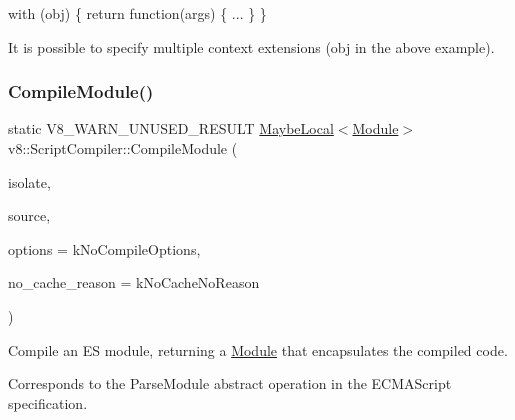 with (obj) \{ return function(args) \{ ... \} \}

It is possible to specify multiple context extensions (obj in the above example). \mbox{\label{classv8_1_1ScriptCompiler_a7a735ad28cd9925ef67c57a76422116c}} 
\subsubsection{\texorpdfstring{Compile\+Module()}{CompileModule()}}
{\footnotesize\ttfamily static V8\+\_\+\+W\+A\+R\+N\+\_\+\+U\+N\+U\+S\+E\+D\+\_\+\+R\+E\+S\+U\+LT \mbox{\hyperlink{classv8_1_1MaybeLocal}{Maybe\+Local}}$<$\mbox{\hyperlink{classv8_1_1Module}{Module}}$>$ v8\+::\+Script\+Compiler\+::\+Compile\+Module (\begin{DoxyParamCaption}\item[{Isolate $\ast$}]{isolate,  }\item[{\mbox{\hyperlink{classv8_1_1ScriptCompiler_1_1Source}{Source}} $\ast$}]{source,  }\item[{Compile\+Options}]{options = {\ttfamily kNoCompileOptions},  }\item[{\mbox{\hyperlink{classv8_1_1ScriptCompiler_a7f13fa15484cfc500ae51927756e0d60}{No\+Cache\+Reason}}}]{no\+\_\+cache\+\_\+reason = {\ttfamily kNoCacheNoReason} }\end{DoxyParamCaption})\hspace{0.3cm}{\ttfamily [static]}}

Compile an ES module, returning a \mbox{\hyperlink{classv8_1_1Module}{Module}} that encapsulates the compiled code.

Corresponds to the Parse\+Module abstract operation in the E\+C\+M\+A\+Script specification. \mbox{\label{classv8_1_1ScriptCompiler_a4054a9857df7f2e6a8747f23108776e7}} 
